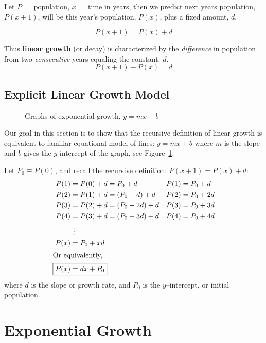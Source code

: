 Let \(P=\) population, \(x=\) time in years, then we predict next
years population, \(P(x+1)\), will be this year's population,
\(P(x)\), plus a fixed amount, \(d\).

\begin{equation}
  \boxed{P(x+1) = P(x) + d}\label{eq:recursive-linear-model}
\end{equation}

Thus \textbf{linear growth} (or decay) is characterized by the
\emph{difference} in population from two \emph{consecutive} years
equaling the constant: \(d\).
\[
  \boxed{P(x+1) - P(x) = d}
\]

\subsection{Explicit Linear Growth Model}%
\label{sec:explicit-linear}

\begin{figure}[b]
  \centering
  
  
  \caption{Graphs of exponential growth, \(y=mx+b\)}%
  \label{fig:linear-growth}
\end{figure}

Our goal in this section is to show that the recursive definition of
linear growth is equivalent to familiar equational model of lines:
\(y=mx+b\) where \(m\) is the slope and \(b\) gives the
\(y\)-intercept of the graph, see Figure~\ref{fig:linear-growth}.

Let \(P_0\equiv P(0)\), and recall the recursive definition:
\(P(x+1) = P(x) + d \):
\begin{align*}
  P(1) &= P(0) + d = P_{0} + d & P(1) &= P_{0} + d\\
  P(2) &= P(1) + d = (P_{0} + d) + d & P(2) &= P_{0} + 2d \\
  P(3) &= P(2) + d = (P_{0} + 2d) + d & P(3) &= P_{0} + 3d \\
  P(4) &= P(3) + d = (P_{0} + 3d) + d & P(4) &= P_{0} + 4d \\
       & \: \: \vdots && \\
  P(x) &= P_{0} + xd &&\\
  \intertext{Or equivalently,}
  \Aboxed{P(x) &= dx + P_0} &&
\end{align*}
where \(d\) is the slope or growth rate, and \(P_0\) is the
\(y\)--intercept, or initial population.

\newpage

\section{Exponential Growth}%
\label{sec:exponential-growth}

